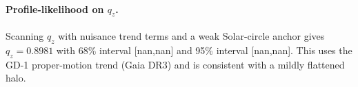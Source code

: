 
\paragraph{Profile-likelihood on $q_z$.}
Scanning $q_z$ with nuisance trend terms and a weak Solar-circle anchor gives
$q_z = 0.8981$ with 68\% interval [nan,nan] and 95\% interval [nan,nan].
This uses the GD-1 proper-motion trend (Gaia DR3) and is consistent with a mildly flattened halo.
